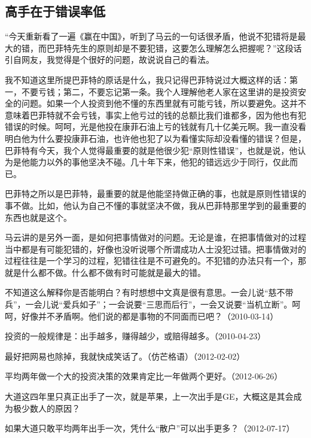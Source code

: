 \subsection{高手在于错误率低}

“今天重新看了一遍《赢在中国》，听到了马云的一句话很矛盾，他说不犯错将是最大的错，而巴菲特先生的原则却是不要犯错，这要怎么理解怎么把握呢？”这段话引自网友，我觉得是个很好的问题，故说说自己的看法。

我不知道这里所提巴菲特的原话是什么，我只记得巴菲特说过大概这样的话：第一，不要亏钱；第二，不要忘记第一条。我个人理解他老人家在这里讲的是投资安全的问题。如果一个人投资到他不懂的东西里就有可能亏钱，所以要避免。这并不意味着巴菲特就不会亏钱，事实上他亏过的钱的总额比我们谁都多，因为他也有犯错误的时候。呵呵，光是他投在康菲石油上亏的钱就有几十亿美元啊。我一直没看明白他为什么要投康菲石油，也许他也犯了以为看懂实际却没看懂的错误？但是，巴菲特有今天，我个人觉得最重要的就是他很少犯“原则性错误”，也就是说，他认为是他能力以外的事他坚决不碰。几十年下来，他犯的错远远少于同行，仅此而已。

巴菲特之所以是巴菲特，最重要的就是他能坚持做正确的事，也就是原则性错误的事不做。比如，他认为自己不懂的事就坚决不做，我从巴菲特那里学到的最重要的东西也就是这个。

马云讲的是另外一面，是如何把事情做对的问题。无论是谁，在把事情做对的过程当中都是有可能犯错的，好像也没听说哪个所谓成功人士没犯过错。把事情做对的过程往往是一个学习的过程，犯错往往是不可避免的。不犯错的办法只有一个，那就是什么都不做。什么都不做有时可能就是最大的错。

不知道这么解释你是否能明白？有时想想中文真是很有意思。一会儿说“慈不带兵”，一会儿说“爱兵如子”；一会说要“三思而后行”，一会又说要“当机立断”。呵呵，好像并不矛盾啊。他们说的都是事物的不同面而已吧？（2010-03-14）

投资的一般规律是：出手越多，赚得越少，或赔得越多。（2010-04-23）


最好把网易也除掉，我就快成笑话了。（仿芒格语）（2012-02-02）

平均两年做一个大的投资决策的效果肯定比一年做两个更好。（2012-06-26）

大道这四年里只真正出手了一次，就是苹果，上一次出手是GE，大概这是其会成为极少数人的原因？

如果大道只敢平均两年出手一次，凭什么“散户”可以出手更多？（2012-07-17）

